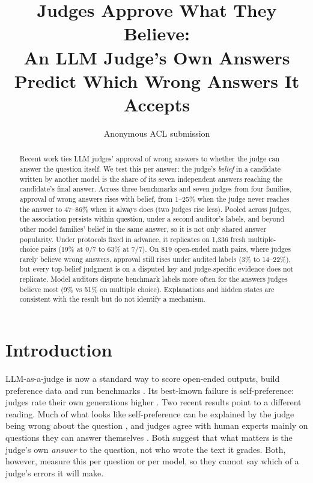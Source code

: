\documentclass[11pt]{article}
\title{Judges Approve What They Believe:\\An LLM Judge's Own Answers Predict Which Wrong Answers It Accepts}
\author{Anonymous ACL submission}
\begin{document}
\maketitle

\begin{abstract}
Recent work ties LLM judges' approval of wrong answers to whether the judge can answer the question itself. We test
this per answer: the judge's \emph{belief} in a candidate written by another model is the share of its seven
independent answers reaching the candidate's final answer. Across three benchmarks and seven judges from four
families, approval of wrong answers rises with belief, from 1--25\% when the judge never reaches the answer to
47--86\% when it always does (two judges rise less). Pooled across judges, the association persists within question,
under a second auditor's labels, and beyond other model families' belief in the same answer, so it is not only shared
answer popularity. Under protocols fixed in advance, it replicates on 1,336 fresh multiple-choice pairs
(19\% at 0/7 to 63\% at 7/7). On 819 open-ended math pairs, where judges rarely believe wrong answers, approval still
rises under audited labels (3\% to 14--22\%), but every top-belief judgment is on a disputed key and
judge-specific evidence does not replicate. Model auditors dispute benchmark labels more often for the answers judges
believe most (9\% vs 51\% on multiple choice). Explanations and hidden states are consistent with the result but do
not identify a mechanism.
\end{abstract}

\section{Introduction}

LLM-as-a-judge is now a standard way to score open-ended outputs, build preference data and run benchmarks
\citep{zheng2023judging}. Its best-known failure is self-preference: judges rate their own generations higher
\citep{panickssery2024llm}. Two recent results point to a different reading. Much of what looks like
self-preference can be explained by the judge being wrong about the question \citep{roytburg2026narcissists}, and
judges agree with human experts mainly on questions they can answer themselves \citep{krumdick2026nofreelabels}.
Both suggest that what matters is the judge's own \emph{answer} to the question, not who wrote the text it grades.
Both, however, measure this per question or per model, so they cannot say which of a judge's errors it will make.
\end{document}
